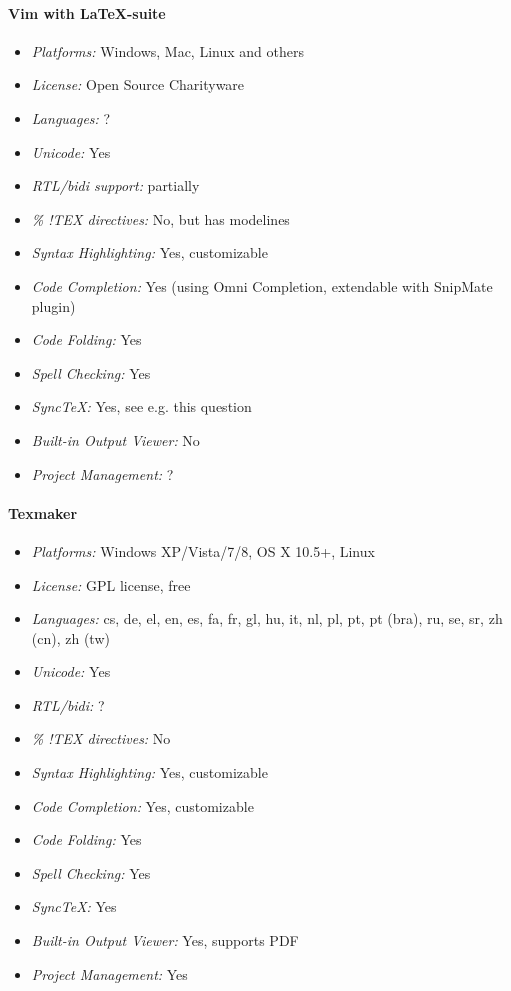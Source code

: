 \paragraph{Vim with LaTeX-suite}

\begin{itemize}
    \item \textit{Platforms:} Windows, Mac, Linux and others
    \item \textit{License:} Open Source Charityware
    \item \textit{Languages:} ?
    \item \textit{Unicode:} Yes
    \item \textit{RTL/bidi support:} partially
    \item \textit{\% !TEX directives:} No, but has modelines
    \item \textit{Syntax Highlighting:} Yes, customizable
    \item \textit{Code Completion:} Yes (using Omni Completion, extendable with SnipMate plugin)
    \item \textit{Code Folding:} Yes
    \item \textit{Spell Checking:} Yes
    \item \textit{SyncTeX:} Yes, see e.g. this question
    \item \textit{Built-in Output Viewer:} No
    \item \textit{Project Management:} ?
\end{itemize}

\paragraph{Texmaker}

\begin{itemize}
    \item \textit{Platforms:} Windows XP/Vista/7/8, OS X 10.5+, Linux
    \item \textit{License:} GPL license, free
    \item \textit{Languages:} cs, de, el, en, es, fa, fr, gl, hu, it, nl, pl, pt, pt (bra), ru, se, sr, zh (cn), zh (tw)
    \item \textit{Unicode:} Yes
    \item \textit{RTL/bidi:} ?
    \item \textit{\% !TEX directives:} No
    \item \textit{Syntax Highlighting:} Yes, customizable
    \item \textit{Code Completion:} Yes, customizable
    \item \textit{Code Folding:} Yes
    \item \textit{Spell Checking:} Yes
    \item \textit{SyncTeX:} Yes
    \item \textit{Built-in Output Viewer:} Yes, supports PDF
    \item \textit{Project Management:} Yes
\end{itemize}

